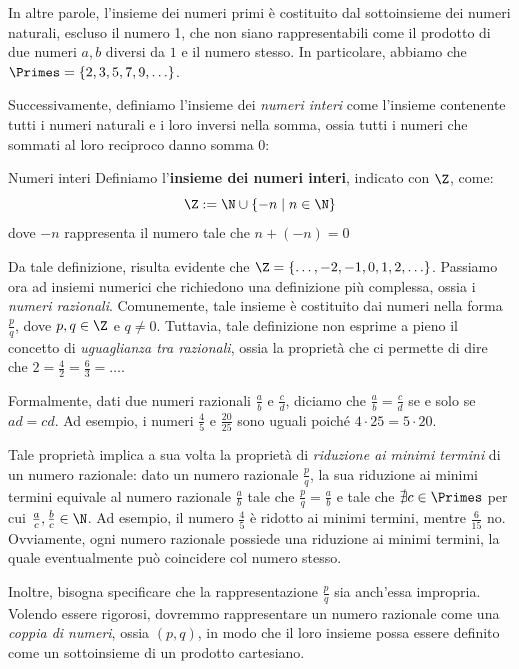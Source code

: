\documentclass[a4paper, 12pt]{report}
\begin{document}
    In altre parole, l'insieme dei numeri primi è costituito dal sottoinsieme dei numeri naturali, escluso il numero 1, che non siano rappresentabili come il prodotto di due numeri $a,b$ diversi da $1$ e il numero stesso. In particolare, abbiamo che $\Primes = \{2, 3, 5, 7, 9, \ldots\}$.
    
    Successivamente, definiamo l'insieme dei \textit{numeri interi} come l'insieme contenente tutti i numeri naturali e i loro inversi nella somma, ossia tutti i numeri che sommati al loro reciproco danno somma 0:
    \begin{frameddefn}{Numeri interi}
        Definiamo l'\textbf{insieme dei numeri interi}, indicato con $\Z$, come:
        \[\Z := \N \cup \{-n \mid n \in \N\} \]
        dove $-n$ rappresenta il numero tale che $n + (-n) = 0$
    \end{frameddefn}

    Da tale definizione, risulta evidente che $\Z = \{\ldots, -2, -1, 0, 1, 2, \ldots\}$. Passiamo ora ad insiemi numerici che richiedono una definizione più complessa, ossia i \textit{numeri razionali}. Comunemente, tale insieme è costituito dai numeri nella forma $\frac{p}{q}$, dove $p,q \in \Z$ e $q \neq 0$. Tuttavia, tale definizione non esprime a pieno il concetto di \textit{uguaglianza tra razionali}, ossia la proprietà che ci permette di dire che $2 = \frac{4}{2} = \frac{6}{3} = \ldots$.

    Formalmente, dati due numeri razionali $\frac{a}{b}$ e $\frac{c}{d}$, diciamo che $\frac{a}{b} = \frac{c}{d}$ se e solo se $ad = cd$. Ad esempio, i numeri $\frac{4}{5}$ e $\frac{20}{25}$ sono uguali poiché $4 \cdot 25 = 5 \cdot 20$.

    Tale proprietà implica a sua volta la proprietà di \textit{riduzione ai minimi termini} di un numero razionale: dato un numero razionale $\frac{p}{q}$, la sua riduzione ai minimi termini equivale al numero razionale $\frac{a}{b}$ tale che $\frac{p}{q} = \frac{a}{b}$ e tale che $\nexists c \in \Primes$ per cui $\frac{a}{c}, \frac{b}{c} \in \N$. Ad esempio, il numero $\frac{4}{5}$ è ridotto ai minimi termini, mentre $\frac{6}{15}$ no. Ovviamente, ogni numero razionale possiede una riduzione ai minimi termini, la quale eventualmente può coincidere col numero stesso.

    Inoltre, bisogna specificare che la rappresentazione $\frac{p}{q}$ sia anch'essa impropria. Volendo essere rigorosi, dovremmo rappresentare un numero razionale come una \textit{coppia di numeri}, ossia $(p,q)$, in modo che il loro insieme possa essere definito come un sottoinsieme di un prodotto cartesiano.
\end{document}
